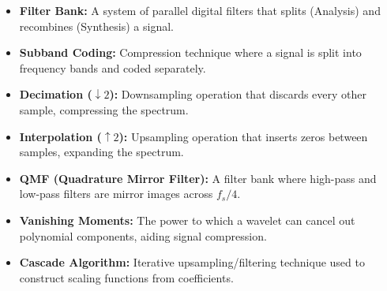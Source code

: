 \documentclass[12pt,a4paper]{article}
\begin{document}
\begin{tcolorbox}[defbox, title={\textbf{One-Line Definitions}}]
\begin{itemize}[leftmargin=*, itemsep=3.5pt]
  \item \textbf{Filter Bank:} A system of parallel digital filters that splits (Analysis) and recombines (Synthesis) a signal.
  \item \textbf{Subband Coding:} Compression technique where a signal is split into frequency bands and coded separately.
  \item \textbf{Decimation ($\downarrow 2$):} Downsampling operation that discards every other sample, compressing the spectrum.
  \item \textbf{Interpolation ($\uparrow 2$):} Upsampling operation that inserts zeros between samples, expanding the spectrum.
  \item \textbf{QMF (Quadrature Mirror Filter):} A filter bank where high-pass and low-pass filters are mirror images across $f_s/4$.
  \item \textbf{Vanishing Moments:} The power to which a wavelet can cancel out polynomial components, aiding signal compression.
  \item \textbf{Cascade Algorithm:} Iterative upsampling/filtering technique used to construct scaling functions from coefficients.
\end{itemize}
\end{tcolorbox}
\end{document}
